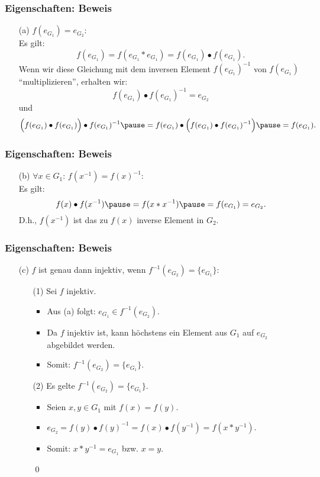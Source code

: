 %
%
\begin{frame}\frametitle{Eigenschaften: Beweis}

	\begin{itemize}
		\item[(a)] $f(e_{G_1}) = e_{G_2}$:\\
				Es gilt:
				$$
					f(e_{G_1}) = f(e_{G_1}\ast e_{G_1}) = f(e_{G_1})\bullet f(e_{G_1}).
				$$\pause
				Wenn wir diese Gleichung mit dem inversen Element  $f(e_{G_1})^{-1}$ von $f(e_{G_1})$ ``multiplizieren'', erhalten wir:
				$$
					f(e_{G_1})\bullet f(e_{G_1})^{-1} = e_{G_2}
				$$\pause
				und
				$$
					\Big(f(e_{G_1})\bullet f(e_{G_1})\Big) \bullet  f(e_{G_1})^{-1}  \pause= 
						f(e_{G_1})\bullet \Big( f(e_{G_1}) \bullet  f(e_{G_1})^{-1} \Big) \pause= f(e_{G_1}).
				$$

	\end{itemize} 
	
\end{frame}
%
%
\begin{frame}\frametitle{Eigenschaften: Beweis}

	\begin{itemize}
		\item[(b)] $\forall x\in G_1:\, f(x^{-1}) = f(x)^{-1}$:\\
				Es gilt:
				$$
					f(x)\bullet f(x^{-1}) \pause= f(x\ast x^{-1}) \pause= f(e_{G_1}) = e_{G_2}.
				$$
				D.h., $f(x^{-1})$ ist das zu $f(x)$ inverse Element in $G_2$.
	\end{itemize} 
	
\end{frame}
%
%
\begin{frame}\frametitle{Eigenschaften: Beweis}
	\begin{itemize}
		\item[(c)] $f$ ist genau dann injektiv, wenn $f^{-1}(e_{G_2}) = \{e_{G_1}\}$:\\
				\pause \vfill
				\begin{itemize}
					\item[(1)] Sei $f$ injektiv. 
							\begin{itemize}
								\item Aus (a) folgt: $e_{G_1} \in f^{-1}(e_{G_2})$.
								\pause
								\item Da $f$ injektiv ist, kann höchstens ein Element aus $G_1$ auf $e_{G_2}$ abgebildet werden.
								\pause
								\item Somit: $f^{-1}(e_{G_2}) = \{e_{G_1}\}$.
							\end{itemize}
					\pause		 \vfill
					\item[(2)] Es gelte $f^{-1}(e_{G_2}) = \{e_{G_1}\}$.
							\begin{itemize}
								\item Seien $x,y \in G_1$ mit $f(x)=f(y)$. 
								\pause
								\item $e_{G_2} = f(y)\bullet f(y)^{-1} = f(x)\bullet f(y^{-1}) = f(x\ast y^{-1})$.
								\pause
								\item Somit: $x\ast y^{-1} = e_{G_1}$ bzw. $x=y$.
							\end{itemize}
							\hfill\qed
				\end{itemize} 
	\end{itemize} 
\end{frame}
%
%
